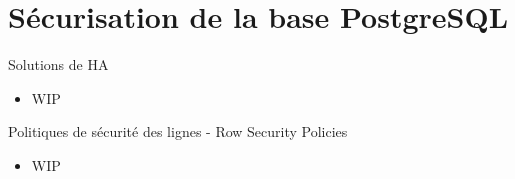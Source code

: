 
\section{Sécurisation de la base PostgreSQL}


\begin{frame}[fragile]{Solutions de HA}

   \begin{itemize}
      \item WIP
   \end{itemize}

\begin{toile}
\end{toile}

\end{frame}


\begin{frame}[fragile]{Politiques de sécurité des lignes - Row Security Policies}

   \begin{itemize}
      \item WIP
   \end{itemize}

\begin{toile}
\end{toile}

\end{frame}


